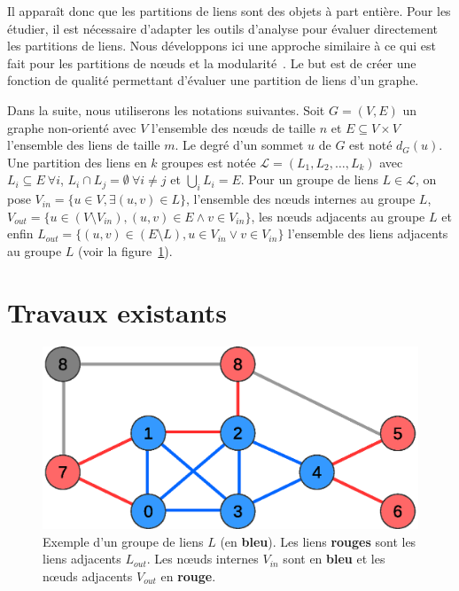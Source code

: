 Il apparaît donc que les partitions de liens sont des objets à part entière.
Pour les étudier, il est nécessaire d'adapter les outils d'analyse pour évaluer directement les partitions de liens.
Nous développons ici une approche similaire à ce qui est fait pour les partitions de n\oe{}uds et la modularité~\cite{Newman2004}.
Le but est de créer une fonction de qualité permettant d'évaluer une partition de liens d'un graphe.

Dans la suite, nous utiliserons les notations suivantes.
Soit $G=(V,E)$ un graphe non-orienté avec $V$ l'ensemble des n\oe{}uds de taille $n$ et $E \subseteq V \times V$ l'ensemble des liens de taille $m$. 
Le degré d'un sommet $u$ de $G$ est noté $d_G(u)$.
Une partition des liens en $k$ groupes est notée $\mathcal{L}=(L_1,L_2,\ldots,L_k)$ avec $L_i \subseteq E \ \forall i$, $L_i\cap L_j=\emptyset \ \forall i\neq j$ et $\bigcup_i L_i=E$.
Pour un groupe de liens $L \in \mathcal{L}$, on pose $V_{in}=\{u \in V, \exists (u,v) \in L\}$, l'ensemble des n\oe{}uds internes au groupe $L$, $V_{out}=\{u \in (V\setminus V_{in}), (u,v) \in E \wedge v \in V_{in} \}$, les n\oe{}uds adjacents au groupe $L$ et enfin $L_{out}=\{(u,v) \in (E \setminus L), u \in V_{in} \vee v \in V_{in} \}$ l'ensemble des liens adjacents au groupe $L$ (voir la figure~\ref{fig:example_def_expected}).

\section{Travaux existants}
\label{sec:expected_travaux}
\begin{figure}
\centering
\includegraphics[width=0.4\linewidth]{img/ExpectedNodes/exemple2}
\caption{Exemple d'un groupe de liens $L$ (en \textcolor{semilightblue}{\textbf{bleu}}). Les liens \textcolor{pinkyred}{\textbf{rouges}} sont les liens adjacents $L_{out}$.
Les n\oe{}uds internes $V_{in}$ sont en \textcolor{semilightblue}{\textbf{bleu}} et les n\oe{}uds adjacents $V_{out}$ en \textcolor{pinkyred}{\textbf{rouge}}.}
\label{fig:example_def_expected}
\end{figure}

